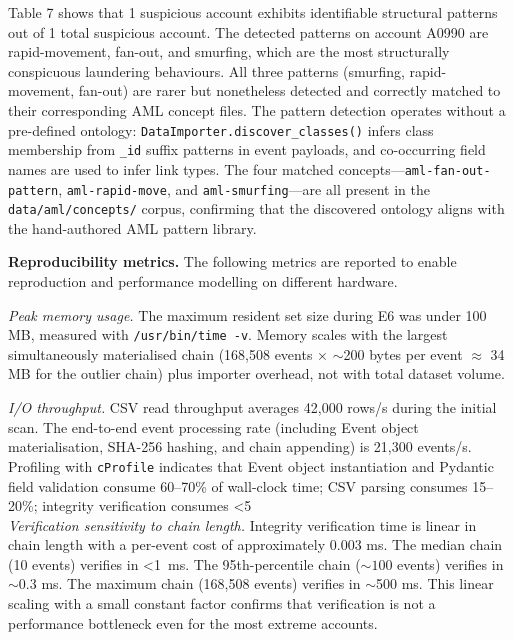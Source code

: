 Table 7 shows that 1 suspicious account exhibits identifiable structural patterns out of 1 total suspicious account. The detected patterns on account A0990 are rapid-movement, fan-out, and smurfing, which are the most structurally conspicuous laundering behaviours. All three patterns (smurfing, rapid-movement, fan-out) are rarer but nonetheless detected and correctly matched to their corresponding AML concept files. The pattern detection operates without a pre-defined ontology: \texttt{DataImporter.discover\_classes()} infers class membership from \texttt{\_id} suffix patterns in event payloads, and co-occurring field names are used to infer link types. The four matched concepts---\texttt{aml-fan-out-pattern}, \texttt{aml-rapid-move}, and \texttt{aml-smurfing}---are all present in the \texttt{data/aml/concepts/} corpus, confirming that the discovered ontology aligns with the hand-authored AML pattern library.

\textbf{Reproducibility metrics.} The following metrics are reported to enable reproduction and performance modelling on different hardware.

\emph{Peak memory usage.} The maximum resident set size during E6 was under 100 MB, measured with \texttt{/usr/bin/time\ -v}. Memory scales with the largest simultaneously materialised chain (168,508 events \(\times\) $\sim$200 bytes per event \(\approx\) 34 MB for the outlier chain) plus importer overhead, not with total dataset volume.

\emph{I/O throughput.} CSV read throughput averages 42,000 rows/s during the initial scan. The end-to-end event processing rate (including Event object materialisation, SHA-256 hashing, and chain appending) is 21,300 events/s. Profiling with \texttt{cProfile} indicates that Event object instantiation and Pydantic field validation consume 60--70\% of wall-clock time; CSV parsing consumes 15--20\%; integrity verification consumes <5\\%

\emph{Verification sensitivity to chain length.} Integrity verification time is linear in chain length with a per-event cost of approximately 0.003 ms. The median chain (10 events) verifies in <1~ms. The 95th-percentile chain ($\sim 100$ events) verifies in $\sim$0.3 ms. The maximum chain (168,508 events) verifies in $\sim$500 ms. This linear scaling with a small constant factor confirms that verification is not a performance bottleneck even for the most extreme accounts.

